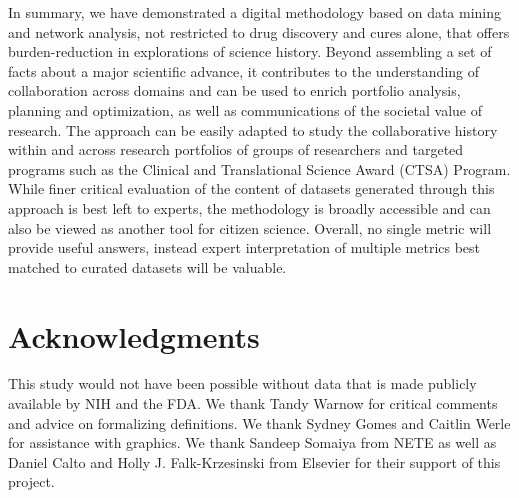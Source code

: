 \documentclass[10pt,letterpaper]{article}
\begin{document}
In summary, we have demonstrated a digital methodology based on data mining and network analysis, not restricted to  drug discovery and cures alone, that offers burden-reduction in explorations of science history. Beyond assembling a set of facts about a major scientific advance, it contributes to the understanding of collaboration across domains and can be used to  enrich portfolio analysis, planning and optimization, as well as communications of the societal value of research. The approach can be easily adapted to study the collaborative history within and across research portfolios of groups of researchers and targeted programs such as the Clinical and Translational Science Award (CTSA) Program. While finer critical evaluation of the content of datasets generated through this approach is best left to experts, the methodology is broadly accessible and can also be viewed as another tool for citizen science. Overall, no single metric will provide useful answers, instead expert interpretation of multiple metrics best matched to curated datasets will be valuable.

\section*{Acknowledgments}  This study would not have been possible without data that is made publicly available by NIH and the FDA. We thank Tandy Warnow for critical comments and advice on formalizing definitions. We thank Sydney Gomes and Caitlin Werle for assistance with graphics. We thank Sandeep Somaiya from NETE as well as Daniel Calto and Holly J. Falk-Krzesinski from Elsevier for their support of this project. 

 
\end{document}
